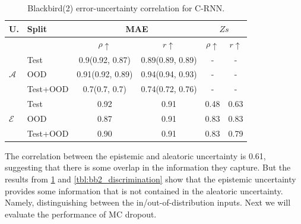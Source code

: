 \begin{table}[h]
\centering
    \begin{tabular}{l l c c c c}  
        \toprule
        U. & Split & \multicolumn{2}{c}{MAE} & \multicolumn{2}{c}{$Zs$}\\
        \midrule
        & & $\rho \uparrow$ & $r \uparrow$ & $\rho \uparrow$ & $r \uparrow$ \\
        \multirow{3}{*}{$\mathcal{A}$} 
            & Test     & 0.9(0.92, 0.87) & 0.89(0.89, 0.89) & - & - \\  
            & OOD      & 0.91(0.92, 0.89) & 0.94(0.94, 0.93) & - & - \\  
            & Test+OOD & 0.7(0.7, 0.7) & 0.74(0.72, 0.76) & - & - \\ 

        \midrule
        \multirow{3}{*}{$\mathcal{E}$} 
            & Test     & 0.92  & 0.91 &  0.48  & 0.63 \\  
            & OOD      & 0.87 & 0.91 &  0.83 & 0.83 \\
            & Test+OOD & 0.90 & 0.91 &  0.83 & 0.79 \\ 

        \toprule
    \end{tabular}
    \caption{Blackbird(2) error-uncertainty correlation for C-RNN.}
    \label{tbl:bb2_corr}
\end{table}


The correlation between the epistemic and aleatoric uncertainty is 0.61, suggesting that there is some overlap in the information they capture. But the results from \cref{tbl:bb2_corr} and \cref{tbl:bb2_discrimination} show that the epistemic uncertainty provides some information that is not contained in the aleatoric uncertainty. Namely, distinguishing between the in/out-of-distribution inputs. Next we will evaluate the performance of MC dropout. 

